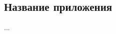 \documentclass[../document.tex]{subfiles}
\begin{document}
    \begin{fefuappendices}
        \section{Название приложения}
            \par ...
    \end{fefuappendices}
\end{document}
